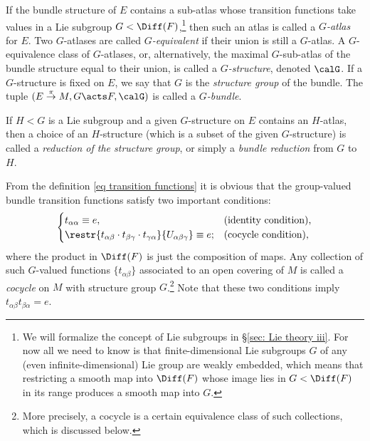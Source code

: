 \begin{defn}[$G$-structure]
    If the bundle structure of $E$ contains a sub-atlas whose transition functions take values in a Lie subgroup $G<\Diff(F)$,\footnote{We will formalize the concept of Lie subgroups in \S\ref{sec: Lie theory iii}. For now all we need to know is that finite-dimensional Lie subgroups $G$ of any (even infinite-dimensional) Lie group are weakly embedded, which means that restricting a smooth map into $\Diff(F)$ whose image lies in $G<\Diff(F)$ in its range produces a smooth map into $G$.} then such an atlas is called a \emph{$G$-atlas} for $E$. Two $G$-atlases are called \emph{$G$-equivalent} if their union is still a $G$-atlas. A $G$-equivalence class of $G$-atlases, or, alternatively, the maximal $G$-sub-atlas of the bundle structure equal to their union, is called a \emph{$G$-structure}, denoted $\calG$. If a $G$-structure is fixed on $E$, we say that $G$ is the \emph{structure group} of the bundle.  The tuple $(E\overset{\pi}{\to}M,G\acts F,\calG)$ is called a \emph{$G$-bundle}.
    
    If $H<G$ is a Lie subgroup and a given $G$-structure on $E$ contains an $H$-atlas, then a choice of an $H$-structure (which is a subset of the given $G$-structure) is called a \emph{reduction of the structure group}, or simply a \emph{bundle reduction} from $G$ to $H$.
\end{defn}    

\begin{defn}[Cocycles]
    From the definition \eqref{eq transition functions} it is obvious that the group-valued bundle transition functions satisfy two important conditions:
    \[
    \begin{cases}
    t_{\alpha\alpha}\equiv e, & \text{(identity condition),}\\
    \restr{t_{\alpha\beta}\cdot t_{\beta\gamma}\cdot t_{\gamma\alpha}}{U_{\alpha\beta\gamma}}\equiv e; & \text{(cocycle condition),}
    \end{cases}
    \]
    where the product in $\Diff(F)$ is just the composition of maps. Any collection of such $G$-valued functions $\{t_{\alpha\beta}\}$ associated to an open covering of $M$ is called a \emph{cocycle} on $M$ with structure group $G$.\footnote{More precisely, a cocycle is a certain equivalence class of such collections, which is discussed below.} Note that these two conditions imply $t_{\alpha\beta}t_{\beta\alpha}=e$.
\end{defn}

